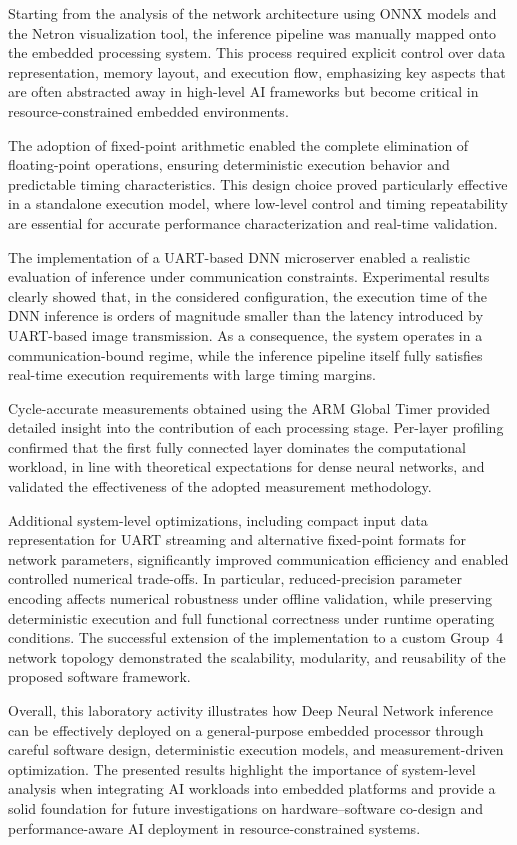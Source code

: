 Starting from the analysis of the network architecture using ONNX models and the
Netron visualization tool, the inference pipeline was manually mapped onto the
embedded processing system.
This process required explicit control over data representation, memory layout,
and execution flow, emphasizing key aspects that are often abstracted away in
high-level AI frameworks but become critical in resource-constrained embedded
environments.

The adoption of fixed-point arithmetic enabled the complete elimination of
floating-point operations, ensuring deterministic execution behavior and
predictable timing characteristics.
This design choice proved particularly effective in a standalone execution model,
where low-level control and timing repeatability are essential for accurate
performance characterization and real-time validation.

The implementation of a UART-based DNN microserver enabled a realistic evaluation
of inference under communication constraints.
Experimental results clearly showed that, in the considered configuration, the
execution time of the DNN inference is orders of magnitude smaller than the latency
introduced by UART-based image transmission.
As a consequence, the system operates in a communication-bound regime, while the
inference pipeline itself fully satisfies real-time execution requirements with
large timing margins.

Cycle-accurate measurements obtained using the ARM Global Timer provided detailed
insight into the contribution of each processing stage.
Per-layer profiling confirmed that the first fully connected layer dominates the
computational workload, in line with theoretical expectations for dense neural
networks, and validated the effectiveness of the adopted measurement methodology.

Additional system-level optimizations, including compact input data representation
for UART streaming and alternative fixed-point formats for network parameters,
significantly improved communication efficiency and enabled controlled numerical
trade-offs.
In particular, reduced-precision parameter encoding affects numerical robustness
under offline validation, while preserving deterministic execution and full
functional correctness under runtime operating conditions.
The successful extension of the implementation to a custom Group~4 network topology
demonstrated the scalability, modularity, and reusability of the proposed software
framework.

Overall, this laboratory activity illustrates how Deep Neural Network inference can
be effectively deployed on a general-purpose embedded processor through careful
software design, deterministic execution models, and measurement-driven
optimization.
The presented results highlight the importance of system-level analysis when
integrating AI workloads into embedded platforms and provide a solid foundation
for future investigations on hardware--software co-design and performance-aware
AI deployment in resource-constrained systems.


